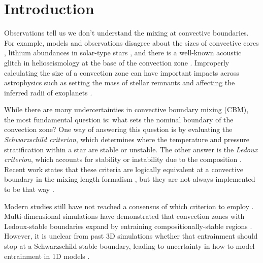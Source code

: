 
\section{Introduction}
\label{sec:introduction}
Observations tell us we don't understand the mixing at convective boundaries.
For example, models and observations disagree about the sizes of convective cores \citep{claret_torres_2018, viani_basu_2020, pedersen_etal_2021}, lithium abundances in solar-type stars \citep{pinsonneault_1997, sestito_randich_2005, carlos_etal_2019, dumont_etal_2021}, and there is a well-known acoustic glitch in helioseismology at the base of the convection zone \citep[see][Sec.~7.2.1]{basu_2016}.
Improperly calculating the size of a convection zone can have important impacts across astrophysics such as setting the mass of stellar remnants \citep{farmer_etal_2019, mehta_etal_2022} and affecting the inferred radii of exoplanets \citep{basu_etal_2012, morrell_2020}.

While there are many undercertainties in convective boundary mixing (CBM), the most fundamental question is: what sets the nominal boundary of the convection zone? 
One way of answering this question is by evaluating the \emph{Schwarzschild criterion}, which determines where the temperature and pressure stratification within a star are stable or unstable.
The other answer is the \emph{Ledoux criterion}, which accounts for stability or instability due to the composition \citep[e.g., the variation of helium abundance with pressure; see][chapter 3, for a nice review of these criteria]{salaris_cassisi_2017}.
Recent work states that these criteria are logically equivalent at a convective boundary in the mixing length formalism \citep{gabriel_etal_2014, mesa4, mesa5}, but they are not always implemented to be that way \citep[as in early versions of the MESA instrument,][]{mesa2}.

Modern studies still have not reached a consensus of which criterion to employ \citep[see][chapter 2, for a brief discussion]{kaiser_etal_2020}.
Multi-dimensional simulations have demonstrated that convection zones with Ledoux-stable boundaries expand by entraining compositionally-stable regions \citep{meakin_arnett_2007, woodward_etal_2015, jones_etal_2017, cristini_etal_2019, fuentes_cumming_2020, andrassy_etal_2020, andrassy_etal_2021}.
However, it is unclear from past 3D simulations whether that entrainment should stop at a Schwarzschild-stable boundary, leading to uncertainty in how to model entrainment in 1D models \citep{staritsin_2013, scott_etal_2021}.

